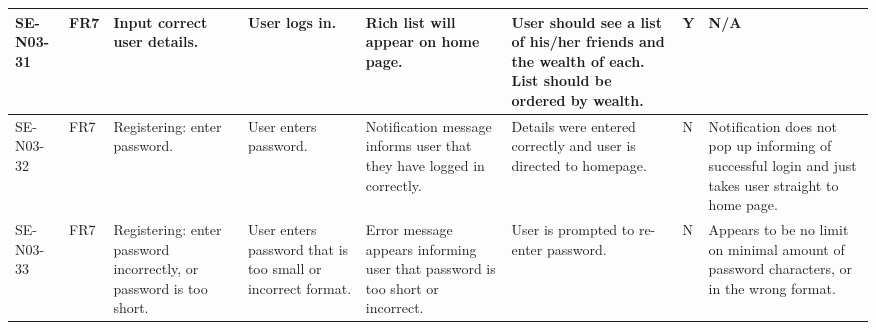 \documentclass[a4paper]{article}
\begin{document}
\begin{landscape}
\begin{center}
\begin{tabular}{| l | l | p{3cm} | p{3cm} | p{4cm} | p{4cm} |p{1cm} |p{3cm} |}
\hline
	SE-N03-31 & FR7 & Input correct user details. & User logs in. & Rich list will appear on home page. & User should see a list of his/her friends and the wealth of each. List should be ordered by wealth. & Y & N/A\\
\hline
	SE-N03-32 & FR7 & Registering: enter password. &  User enters password. & Notification message informs user that they have logged in correctly. & Details were entered correctly and user is directed to homepage. & N & Notification does not pop up informing of successful login and just takes user straight to home page.\\
\hline
	SE-N03-33 & FR7 & Registering: enter password incorrectly, or password is too short. & User enters password that is too small or incorrect format. & Error message appears informing user that password is too short or incorrect. & User is prompted to re-enter password. & N & Appears to be no limit on minimal amount of password characters, or in the wrong format. \\
\hline

\end{tabular}
\end{center}

\clearpage
\begin{center}
\thispagestyle{empty}


\end{center}
\end{landscape}
\end{document}
